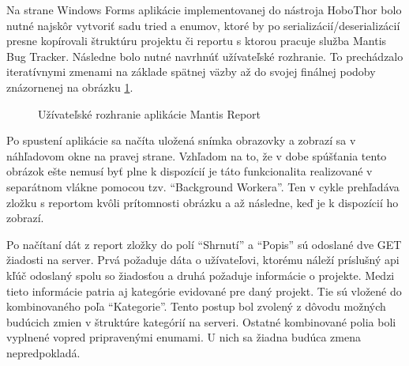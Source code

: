 \documentclass[slovak, bachelorpractice]{diploma}
\begin{document}
Na strane Windows Forms aplikácie implementovanej do nástroja HoboThor bolo nutné najskôr vytvoriť sadu tried a enumov, ktoré by po serializácií/deserializácií presne kopírovali štruktúru projektu či reportu s ktorou pracuje služba Mantis Bug Tracker. Následne bolo nutné navrhnúť užívateľské rozhranie. To prechádzalo iteratívnymi zmenami na základe spätnej väzby až do svojej finálnej podoby znázornenej na obrázku \ref{pic:Report}.

\begin{figure}[!htbp]
	\centering
	\setlength{\fboxsep}{0pt}
	\setlength{\fboxrule}{1pt}
	\caption{Užívateľské rozhranie aplikácie Mantis Report}
	\label{pic:Report}
\end{figure}

Po spustení aplikácie sa načíta uložená snímka obrazovky a zobrazí sa v náhľadovom okne na pravej strane. Vzhľadom na to, že v dobe spúšťania tento obrázok ešte nemusí byť plne k dispozícií je táto funkcionalita realizované v separátnom vlákne pomocou tzv. \enquote{Background Workera}. Ten v cykle prehľadáva zložku s reportom kvôli prítomnosti obrázku a až následne, keď je k dispozícií ho zobrazí.

Po načítaní dát z report zložky do polí \enquote{Shrnutí} a \enquote{Popis} sú odoslané dve GET žiadosti na server. Prvá požaduje dáta o užívateľovi, ktorému náleží príslušný api kľúč odoslaný spolu so žiadosťou a druhá požaduje informácie o projekte. Medzi tieto informácie patria aj kategórie evidované pre daný projekt. Tie sú vložené do kombinovaného poľa \enquote{Kategorie}. Tento postup bol zvolený z dôvodu možných budúcich zmien v štruktúre kategórií na serveri. Ostatné kombinované polia boli vyplnené vopred pripravenými enumami. U nich sa žiadna budúca zmena nepredpokladá.
\end{document}
